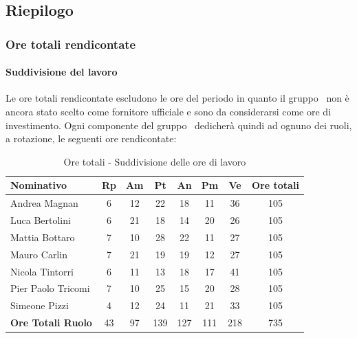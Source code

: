 \documentclass[./PianoDiProgetto.tex]{subfiles}
\begin{document}
\vspace{35mm}

	\subsection{Riepilogo}
			\subsubsection{Ore totali rendicontate}
				\paragraph{Suddivisione del lavoro}
					Le ore totali rendicontate escludono le ore del periodo \PerAR{} in quanto il gruppo \GRUPPO\ non è ancora stato scelto come fornitore ufficiale e sono da considerarsi come ore di investimento. Ogni componente del gruppo \GRUPPO\ dedicherà quindi ad ognuno dei ruoli, a rotazione, le seguenti ore rendicontate:

	\begin{table}[H]
		\begin{tabularx}{\textwidth}{l  * {6}{c}  c}
			\toprule
			\textbf{Nominativo} & \textbf{Rp} & \textbf{Am} & \textbf{Pt}
						& \textbf{An} & \textbf{Pm} & \textbf{Ve} & \textbf{Ore totali} \\
			\midrule
			Andrea Magnan  & 6  & 12 & 22 & 18 & 11  & 36 & 105 \\
			Luca Bertolini  & 6 & 21 & 18 & 14 & 20 & 26 & 105 \\
			Mattia Bottaro  & 7  & 10 & 28 & 22 & 11  & 27 & 105 \\
			Mauro Carlin  & 7 & 21 & 19 & 19 & 12 & 27 & 105 \\
			Nicola Tintorri  & 6 & 11 & 13 & 18 & 17 & 41 & 105 \\
			Pier Paolo Tricomi  & 7 & 10 & 25 & 15 & 20 & 28 & 105 \\
			Simeone Pizzi & 4 & 12 & 24 & 11 & 21 & 33 & 105 \\
			\midrule
			\textbf{Ore Totali Ruolo} & 43    & 97   & 139   & 127   & 111 & 218   & 735 \\
			\bottomrule
		\end{tabularx}
		\caption{Ore totali - Suddivisione delle ore di lavoro}
	\end{table}


\vfill
\end{document}
